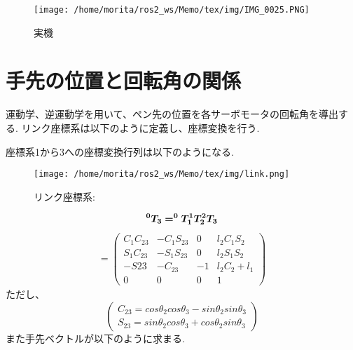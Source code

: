 \documentclass[10pt]{jarticle}
\begin{document}
    \begin{center}
        \begin{figure}[h]
            \texttt{[image: /home/morita/ros2\_ws/Memo/tex/img/IMG\_0025.PNG]}
            \caption{実機}
            \label{manipulator}
        \end{figure}
    \end{center}
    
	\section{手先の位置と回転角の関係}
	運動学、逆運動学を用いて、ペン先の位置を各サーボモータの回転角を導出する.
	リンク座標系は以下のように定義し、座標変換を行う.
	
	座標系1から3への座標変換行列は以下のようになる.
    \begin{center}
        \begin{figure}[h]
            \texttt{[image: /home/morita/ros2\_ws/Memo/tex/img/link.png]}
            \caption{リンク座標系:}
            \label{fig:sample-fig}
        \end{figure}
    \end{center}
$$
	\boldsymbol{ ^{0}T_{3}=^{0}T_{1} ^{1}T_{2} ^{2}T_{3} } \\
$$
	\begin{equation*}
		\begin{array}{cc}
			=
			\left( 
				\begin{array}{cccc}
					C_1C_{23} & -C_1S_{23} & 0 & l_2C_1S_2 \\
					S_1C_{23} & -S_1S_{23} & 0 & l_2S_1S_2 \\
					-S{23} & -C_{23} & -1 & l_2C_2 + l_1 \\
					0 & 0 & 0 & 1 
				\end{array}
			\right)
		\end{array}
	\end{equation*}
	ただし、
	\begin{equation*}
		\left(
		\begin{split}
			C_{23} = cos\theta_2cos\theta_3-sin\theta_2sin\theta_3\\
			S_{23} = sin\theta_2cos\theta_3+cos\theta_2sin\theta_3	
		\end{split}
		\right)
	\end{equation*}
    また手先ベクトルが以下のように求まる.
\end{document}
